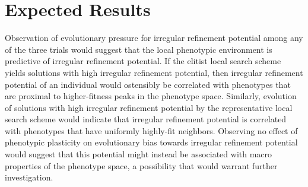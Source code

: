 \section{Expected Results}
Observation of evolutionary pressure for irregular refinement potential among any of the three trials would suggest that the local phenotypic environment is predictive of irregular refinement potential.
If the elitist local search scheme yields solutions with high irregular refinement potential, then irregular refinement potential of an individual would ostensibly be correlated with phenotypes that are proximal to higher-fitness peaks in the phenotype space.
Similarly, evolution of solutions with high irregular refinement potential by the representative local search scheme would indicate that irregular refinement potential is correlated with phenotypes that have uniformly highly-fit neighbors.
Observing no effect of phenotypic plasticity on evolutionary bias towards irregular refinement potential would suggest that this potential might instead be associated with macro properties of the phenotype space, a possibility that would warrant further investigation.
